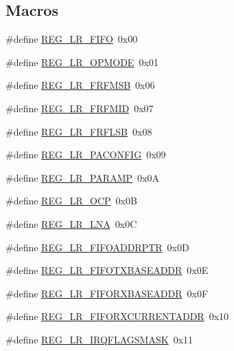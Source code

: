 \subsection*{Macros}
\begin{DoxyCompactItemize}
\item 
\#define \hyperlink{sx1276Regs-LoRa_8h_a0f3e3ea7703c7cb55e2fa4c02ebc6edb}{R\+E\+G\+\_\+\+L\+R\+\_\+\+F\+I\+FO}~0x00
\item 
\#define \hyperlink{sx1276Regs-LoRa_8h_ae13863a0cab88f39c29d875010dc5b25}{R\+E\+G\+\_\+\+L\+R\+\_\+\+O\+P\+M\+O\+DE}~0x01
\item 
\#define \hyperlink{sx1276Regs-LoRa_8h_a8649d29d6156853059baf0e882ee52ec}{R\+E\+G\+\_\+\+L\+R\+\_\+\+F\+R\+F\+M\+SB}~0x06
\item 
\#define \hyperlink{sx1276Regs-LoRa_8h_a63a5c5592931ff821f237f6393b54d95}{R\+E\+G\+\_\+\+L\+R\+\_\+\+F\+R\+F\+M\+ID}~0x07
\item 
\#define \hyperlink{sx1276Regs-LoRa_8h_a97328f9a41f18eb8a0888e003104626a}{R\+E\+G\+\_\+\+L\+R\+\_\+\+F\+R\+F\+L\+SB}~0x08
\item 
\#define \hyperlink{sx1276Regs-LoRa_8h_a8dfd910a5d3e587f7772052710ac3376}{R\+E\+G\+\_\+\+L\+R\+\_\+\+P\+A\+C\+O\+N\+F\+IG}~0x09
\item 
\#define \hyperlink{sx1276Regs-LoRa_8h_a5e5599cfeecea91ca7c5ba1e68c70882}{R\+E\+G\+\_\+\+L\+R\+\_\+\+P\+A\+R\+A\+MP}~0x0A
\item 
\#define \hyperlink{sx1276Regs-LoRa_8h_acdfdcf7cfc15f16c5c8d59fee923ca5f}{R\+E\+G\+\_\+\+L\+R\+\_\+\+O\+CP}~0x0B
\item 
\#define \hyperlink{sx1276Regs-LoRa_8h_a3a52a9b28aecbdddf291c14fe1b69b68}{R\+E\+G\+\_\+\+L\+R\+\_\+\+L\+NA}~0x0C
\item 
\#define \hyperlink{sx1276Regs-LoRa_8h_abdc4c3b5c640a1069f7be689ad5bd908}{R\+E\+G\+\_\+\+L\+R\+\_\+\+F\+I\+F\+O\+A\+D\+D\+R\+P\+TR}~0x0D
\item 
\#define \hyperlink{sx1276Regs-LoRa_8h_a317be2161e52b7ae141564e19598de85}{R\+E\+G\+\_\+\+L\+R\+\_\+\+F\+I\+F\+O\+T\+X\+B\+A\+S\+E\+A\+D\+DR}~0x0E
\item 
\#define \hyperlink{sx1276Regs-LoRa_8h_ad0c1f657286b341e8a305fcc546ff391}{R\+E\+G\+\_\+\+L\+R\+\_\+\+F\+I\+F\+O\+R\+X\+B\+A\+S\+E\+A\+D\+DR}~0x0F
\item 
\#define \hyperlink{sx1276Regs-LoRa_8h_ab571f7dfb8c742a652e427b983cc6962}{R\+E\+G\+\_\+\+L\+R\+\_\+\+F\+I\+F\+O\+R\+X\+C\+U\+R\+R\+E\+N\+T\+A\+D\+DR}~0x10
\item 
\#define \hyperlink{sx1276Regs-LoRa_8h_a2b50ca91ed7db2035a2183b37506eec8}{R\+E\+G\+\_\+\+L\+R\+\_\+\+I\+R\+Q\+F\+L\+A\+G\+S\+M\+A\+SK}~0x11

\end{DoxyCompactItemize}
